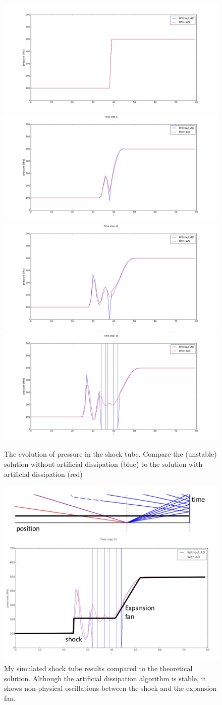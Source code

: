 \documentclass[paper=a4, fontsize=11pt]{scrartcl}
\numberwithin{equation}{section}        %
\numberwithin{figure}{section}          %
\numberwithin{table}{section}               %
\begin{document}
\begin{figure}[H]
    \centering
    \includegraphics[width = 0.4 \textwidth]{../code/results/shock_tube/it0.png}
    \includegraphics[width = 0.4 \textwidth]{../code/results/shock_tube/it6.png}
    \includegraphics[width = 0.4 \textwidth]{../code/results/shock_tube/it14.png}
    \includegraphics[width = 0.4 \textwidth]{../code/results/shock_tube/it18.png}
    \caption{The evolution of pressure in the shock tube. Compare the (unstable) solution without artificial dissipation (blue) to the solution with artificial dissipation (red)}
    \label{fig:shock_tube_evolution}
\end{figure}


\begin{figure}[H]
    \centering
    \includegraphics[width = 0.8 \textwidth]{figures/shock_tube_mc_vs_ideal.png}
    \caption{My simulated shock tube results compared to the theoretical solution. Although the artificial dissipation algorithm is stable, it shows non-physical oscillations between the shock and the expansion fan.}
    \label{fig:shock_tube_mc_vs_ideal}
\end{figure}
\end{document}
